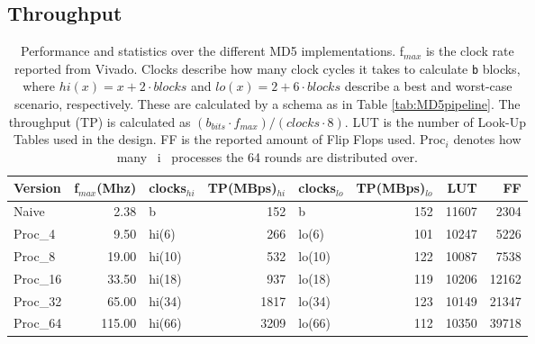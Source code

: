 \documentclass[a4paper, openany]{book}
\begin{document}
\subsection{Throughput}
\label{sec:org215b748}
\begin{table}[!htb]
\centering
\captionsetup{width=.8\linewidth}
\begin{tabular}{l r l r l r r r}
\hline
Version & f$_{max}$(Mhz) & clocks$_{hi}$ & TP(MBps)$_{hi}$ &clocks$_{lo}$ & TP(MBps)$_{lo}$ & LUT & FF\\
\hline
Naive     & 2.38   & b      & 152 & b     & 152 & 11607 & 2304\\
Proc_{4}  & 9.50   & hi(6)  & 266 & lo(6) & 101 & 10247 & 5226\\
Proc_{8}  & 19.00  & hi(10) & 532 & lo(10)& 122 & 10087 & 7538\\
Proc_{16} & 33.50  & hi(18) & 937 & lo(18)& 119 & 10206 & 12162\\
Proc_{32} & 65.00  & hi(34) & 1817& lo(34)& 123 & 10149 & 21347\\
Proc_{64} & 115.00 & hi(66) & 3209& lo(66)&112 &  10350 & 39718\\
\end{tabular}
\caption[MD5: FPGA Versions]%
{Performance and statistics over the different MD5 implementations. f$_{max}$ is the clock rate reported from Vivado. Clocks describe how many clock cycles it takes to calculate \texttt{b} blocks, where $hi(x) = x+2 \cdot blocks$ and $lo(x) = 2 + 6 \cdot blocks$ describe a best and worst-case scenario, respectively. These are calculated by a schema as in Table \ref{tab:MD5pipeline}. The throughput (TP) is calculated as \((b_{bits}\cdot f_{max})/(clocks \cdot 8)\). LUT is the number of Look-Up Tables used in the design. FF is the reported amount of Flip Flops used. Proc$_{i}$ denotes how many ~i~ processes the 64 rounds are distributed over.}
\label{tab:MD5versions}
\end{table}
\end{document}
